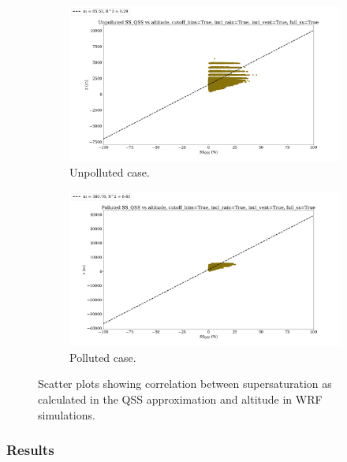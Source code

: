 \documentclass{article}
\begin{document}
\begin{figure}[ht]
	\centering
	\begin{subfigure}{0.7\textwidth}
		\includegraphics[width=\textwidth]{revmywrf/v12_ss_qss_vs_z_Unpolluted_figure.png}
		\caption{Unpolluted case.}
		\label{wrfssqssvszunpoll}
	\end{subfigure}
	\begin{subfigure}{0.7\textwidth}
		\includegraphics[width=\textwidth]{revmywrf/v12_ss_qss_vs_z_Polluted_figure.png}
		\caption{Polluted case.}
		\label{wrfssqssvszpoll}
	\end{subfigure}
	\caption{Scatter plots showing correlation between supersaturation as calculated in the QSS approximation and altitude in WRF simulations.}
	\label{wrfssqssvsz}
\end{figure}

\clearpage
\newpage

\subsubsection{Results}
\end{document}

